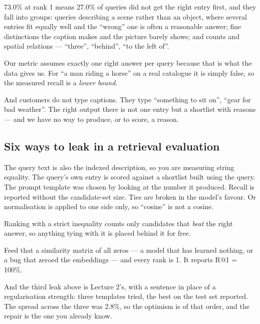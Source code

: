 \documentclass[11pt,a4paper]{article}
\begin{document}
73.0\% at rank 1 means 27.0\% of queries did not get the right entry first, and
they fall into groups: queries describing a scene rather than an object, where
several entries fit equally well and the ``wrong'' one is often a reasonable
answer; fine distinctions the caption makes and the picture barely shows; and
counts and spatial relations --- ``three'', ``behind'', ``to the left of''.

\begin{keybox}[title={One relevant entry is a fiction}]
Our metric assumes exactly one right answer per query because that is what the
data gives us. For ``a man riding a horse'' on a real catalogue it is simply
false, so the measured recall is a \emph{lower bound}.

And customers do not type captions. They type ``something to sit on'', ``gear
for bad weather''. The right output there is not one entry but a shortlist with
reasons --- and we have no way to produce, or to score, a reason.
\end{keybox}

\subsection{Six ways to leak in a retrieval evaluation}

The query text is also the indexed description, so you are measuring string
equality. The query's own entry is scored against a shortlist built using the
query. The prompt template was chosen by looking at the number it produced.
Recall is reported without the candidate-set size. Ties are broken in the
model's favour. Or normalisation is applied to one side only, so ``cosine'' is
not a cosine.

\begin{failbox}[title={Failure condition --- the tie bug, which reports 100\%}]
Ranking with a strict inequality counts only candidates that \emph{beat} the
right answer, so anything tying with it is placed behind it for free.

Feed that a similarity matrix of all zeros --- a model that has learned
nothing, or a bug that zeroed the embeddings --- and every rank is 1. It
reports R@1 = 100\%.
\end{failbox}

And the third leak above is Lecture 2's, with a sentence in place of a
regularisation strength: three templates tried, the best on the test set
reported. The spread across the three was 2.8\%, so the optimism is of that
order, and the repair is the one you already know.
\end{document}
